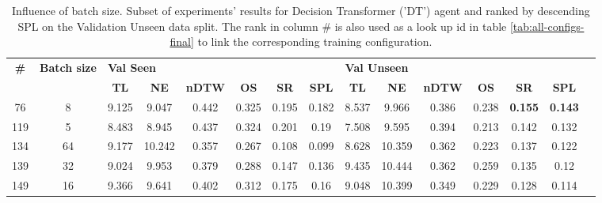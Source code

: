 \begin{table}
\centering
\caption{\label{tab:dt_batch_test}Influence of batch size. Subset of experiments' results for Decision Transformer ('DT') agent and ranked by descending SPL on the Validation Unseen data split. The rank in column \# is also used as a look up id in table \ref{tab:all-configs-final} to link the corresponding training configuration.}
\begin{tabular}{@{\hskip3pt}c@{\hskip3pt}c@{\hskip3pt}c@{\hskip3pt}c@{\hskip3pt}c@{\hskip3pt}c@{\hskip3pt}c@{\hskip3pt}c@{\hskip3pt}c@{\hskip3pt}c@{\hskip3pt}c@{\hskip3pt}c@{\hskip3pt}c@{\hskip3pt}c@{\hskip3pt}c}
\toprule
\textbf{\#} & \textbf{Batch size} & \multicolumn{6}{l}{\textbf{Val Seen}} & \multicolumn{6}{l}{\textbf{Val Unseen}} \\
 \textbf{~} &          \textbf{~} &       \textbf{TL} & \textbf{NE} & \textbf{nDTW} & \textbf{OS} & \textbf{SR} & \textbf{SPL} &         \textbf{TL} & \textbf{NE} & \textbf{nDTW} & \textbf{OS} &     \textbf{SR} &    \textbf{SPL} \\
\midrule
         76 &                   8 &             9.125 &       9.047 &         0.442 &       0.325 &       0.195 &        0.182 &               8.537 &       9.966 &         0.386 &       0.238 &  \textbf{0.155} &  \textbf{0.143} \\
        119 &                   5 &             8.483 &       8.945 &         0.437 &       0.324 &       0.201 &         0.19 &               7.508 &       9.595 &         0.394 &       0.213 &           0.142 &           0.132 \\
        134 &                  64 &             9.177 &      10.242 &         0.357 &       0.267 &       0.108 &        0.099 &               8.628 &      10.359 &         0.362 &       0.223 &           0.137 &           0.122 \\
        139 &                  32 &             9.024 &       9.953 &         0.379 &       0.288 &       0.147 &        0.136 &               9.435 &      10.444 &         0.362 &       0.259 &           0.135 &            0.12 \\
        149 &                  16 &             9.366 &       9.641 &         0.402 &       0.312 &       0.175 &         0.16 &               9.048 &      10.399 &         0.349 &       0.229 &           0.128 &           0.114 \\
\bottomrule
\end{tabular}
\end{table}
